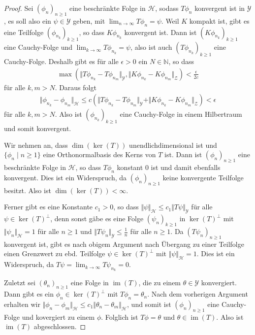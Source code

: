 \documentclass[11pt, hidelinks]{article}
\newcommand{\h}{\mathcal{H}}
\newcommand{\im}{\operatorname{im}}
\newcommand{\on}{{n \geq 1}}
\numberwithin{conj}{section}
\begin{document}
\begin{proof}
    Sei $(\phi_n)_{n \geq 1}$ eine beschränkte Folge in $\h$, sodass $T \phi_n$ konvergent ist in $\mathcal{Y}$, es soll also ein $\psi \in \mathcal{Y}$ geben, mit $\lim_{n\to\infty} T\phi_n = \psi$. Weil $K$ kompakt ist, gibt es eine Teilfolge $(\phi_{n_k})_{k \geq 1}$, so dass $K \phi_{n_k}$ konvergent ist. Dann ist $(K\phi_{n_k})_{k \geq 1}$ eine Cauchy-Folge und $\lim_{k\to\infty} T\phi_{n_k} = \psi$, also ist auch $(T\phi_{n_k})_{k \geq 1}$ eine Cauchy-Folge. Deshalb gibt es für alle $\epsilon > 0$ ein $N\in \mathbb{N}$, so dass
    \begin{align}
        \max(\Vert T\phi_{n_k}-T\phi_{n_m} \Vert_{\mathcal{Y}}, \Vert K\phi_{n_k}-K\phi_{n_m} \Vert_{\mathcal{Z}}) < \frac{\epsilon}{2c}
    \end{align}
    für alle $k,m > N$. Daraus folgt
    \begin{align}
        \Vert \phi_{n_k} - \phi_{n_m} \Vert_\h \leq c (\Vert T\phi_{n_k}-T\phi_{n_m} \Vert_{\mathcal{Y}} +  \Vert K\phi_{n_k}-K\phi_{n_m} \Vert_{\mathcal{Z}}) < \epsilon
    \end{align}
    für alle $k,m > N$. Also ist $(\phi_{n_k})_{k \geq 1}$ eine Cauchy-Folge in einem Hilbertraum und somit konvergent.

    Wir nehmen an, dass $\dim(\ker(T))$ unendlichdimensional ist und $\{\phi_n \;\vert\; n \geq 1\}$ eine Orthonormalbasis des Kerns von $T$ ist. Dann ist $(\phi_n)_{n \geq 1}$ eine beschränkte Folge in $\h$, so dass $T \phi_n$ konstant $0$ ist und damit ebenfalls konvergent. Dies ist ein Widerspruch, da $(\phi_{n})_{n \geq 1}$ keine konvergente Teilfolge besitzt. Also ist $\dim(\ker(T)) < \infty$.

    Ferner gibt es eine Konstante $c_1 > 0$, so dass $\Vert \psi \Vert_\h \leq c_1 \Vert T\psi \Vert_{\mathcal{Y}}$ für alle $\psi \in \ker(T)^\perp$, denn sonst gäbe es eine Folge $(\psi_n)_{k \geq 1}$ in $\ker(T)^\perp$ mit $\Vert \psi_n \Vert_\h = 1$ für alle $n \geq 1$ und $\Vert T\psi_n \Vert_{\mathcal{Y}} \leq \frac{1}{n}$ für alle $n \geq 1$. Da $(T\psi_n)_\on$ konvergent ist, gibt es nach obigem Argument nach Übergang zu einer Teilfolge einen Grenzwert zu ebd. Teilfolge $\psi \in \ker(T)^\perp$ mit $\Vert \psi \Vert_\h = 1$. Dies ist ein Widerspruch, da $T \psi = \lim_{k\to\infty} T \psi_{n_k} = 0$.

    Zuletzt sei $(\theta_n)_{n \geq 1}$ eine Folge in $\im(T)$, die zu einem $\theta \in \mathcal{Y}$ konvergiert. Dann gibt es ein $\phi_n \in \ker(T)^\perp$ mit $T\phi_n = \theta_n$. Nach dem vorherigen Argument erhalten wir $\Vert\phi_n-\phi_m\Vert_\h \leq c_1 \Vert \theta_n - \theta_m \Vert_\h$, und somit ist $(\phi_n)_{n\geq 1}$ eine Cauchy-Folge und kovergiert zu einem $\phi$. Folglich ist $T\phi = \theta$ und $\theta \in \im(T)$. Also ist $\im(T)$ abgeschlossen.
\end{proof}
\end{document}
